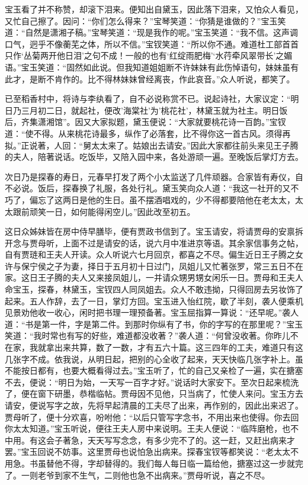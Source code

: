 \begin{parag}
    宝玉看了并不称赞，却滚下泪来。便知出自黛玉，因此落下泪来，又怕众人看见，又忙自己擦了。因问：“你们怎么得来？”宝琴笑道：“你猜是谁做的？”宝玉笑道：“自然是潇湘子稿。”宝琴笑道：“现是我作的呢。”宝玉笑道：“我不信。这声调口气，迥乎不像蘅芜之体，所以不信。”宝钗笑道：“所以你不通。难道杜工部首首只作‘丛菊两开他日泪’之句不成！一般的也有‘红绽雨肥梅’‘水荇牵风翠带长’之媚语。”宝玉笑道：“固然如此说。但我知道姐姐断不许妹妹有此伤悼语句，妹妹虽有此才，是断不肯作的。比不得林妹妹曾经离丧，作此哀音。”众人听说，都笑了。
\end{parag}


\begin{parag}
    已至稻香村中，将诗与李纨看了，自不必说称赏不已。说起诗社，大家议定：“明日乃三月初二日，就起社，便改'海棠社'为'桃花社'，林黛玉就为社主。明日饭后，齐集潇湘馆”。因又大家拟题，黛玉便说：“大家就要桃花诗一百韵。”宝钗道：“使不得。从来桃花诗最多，纵作了必落套，比不得你这一首古风。须得再拟。”正说著，人回：“舅太太来了。姑娘出去请安。”因此大家都往前头来见王子腾的夫人，陪著说话。吃饭毕，又陪入园中来，各处游顽一遍。至晚饭后掌灯方去。
\end{parag}


\begin{parag}
    次日乃是探春的寿日，元春早打发了两个小太监送了几件顽器。合家皆有寿仪，自不必说。饭后，探春换了礼服，各处行礼。黛玉笑向众人道：“我这一社开的又不巧了，偏忘了这两日是他的生日。虽不摆酒唱戏的，少不得都要陪他在老太太，太太跟前顽笑一日，如何能得闲空儿。”因此改至初五。
\end{parag}


\begin{parag}
    这日众姊妹皆在房中侍早膳毕，便有贾政书信到了。宝玉请安，将请贾母的安禀拆开念与贾母听，上面不过是请安的话，说六月中准进京等语。其余家信事务之帖，自有贾琏和王夫人开读。众人听说六七月回京，都喜之不尽。偏生近日王子腾之女许与保宁侯之子为妻，择日于五月初十日过门，凤姐儿又忙著张罗，常三五日不在家。这日王子腾的夫人又来接凤姐儿，一并请众甥男甥女闲乐一日。贾母和王夫人命宝玉，探春，林黛玉，宝钗四人同凤姐去。众人不敢违拗，只得回房去另妆饰了起来。五人作辞，去了一日，掌灯方回。宝玉进入怡红院，歇了半刻，袭人便乘机见景劝他收一收心，闲时把书理一理预备著。宝玉屈指算一算说：“还早呢。”袭人道：“书是第一件，字是第二件。到那时你纵有了书，你的字写的在那里呢？”宝玉笑道：“我时常也有写的好些，难道都没收著？”袭人道：“何曾没收著。你昨儿不在家，我就拿出来共算，数了一数，才有五六十篇。这三四年的工夫，难道只有这几张字不成。依我说，从明日起，把别的心全收了起来，天天快临几张字补上。虽不能按日都有，也要大概看得过去。”宝玉听了，忙的自己又亲检了一遍，实在搪塞不去，便说：“明日为始，一天写一百字才好。”说话时大家安下。至次日起来梳洗了，便在窗下研墨，恭楷临帖。贾母因不见他，只当病了，忙使人来问。宝玉方去请安，便说写字之故，先将早起清晨的工夫尽了出来，再作别的，因此出来迟了。贾母听了，便十分欢喜，吩咐他：“以后只管写字念书，不用出来也使得。你去回你太太知道。”宝玉听说，便往王夫人房中来说明。王夫人便说：“临阵磨枪，也不中用。有这会子著急，天天写写念念，有多少完不了的。这一赶，又赶出病来才罢。”宝玉回说不妨事。这里贾母也说怕急出病来。探春宝钗等都笑说：“老太太不用急。书虽替他不得，字却替得的。我们每人每日临一篇给他，搪塞过这一步就完了。一则老爷到家不生气，二则他也急不出病来。”贾母听说，喜之不尽。
\end{parag}


